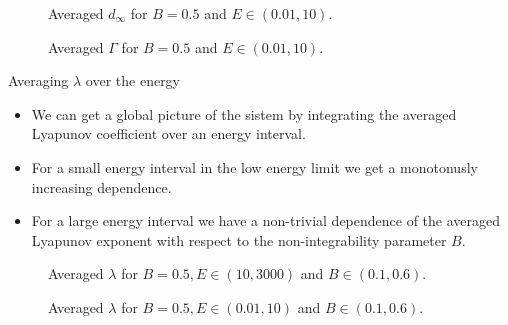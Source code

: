 \documentclass{beamer}
\begin{document}

\begin{frame}
	\begin{figure}
		
		\caption{Averaged \(d_\infty\) for \(B=0.5\) and \(E \in (0.01, 10)\).}
	\end{figure}
\end{frame}


\begin{frame}
	\begin{figure}
		
		\caption{Averaged \(\Gamma\) for \(B=0.5\) and \(E \in (0.01, 10)\).}
	\end{figure}
\end{frame}


\begin{frame}{Averaging \(\lambda\) over the energy}
	\begin{itemize}
		\item We can get a global picture of the sistem by integrating
		the averaged Lyapunov coefficient over an energy interval.
		\item For a small energy interval in the low energy limit we
		get a monotonusly increasing dependence.
		\item For a large energy interval we have a non-trivial
		dependence of the averaged Lyapunov exponent with respect
		to the non-integrability parameter $B$.
	\end{itemize}
\end{frame}


\begin{frame}
	\begin{figure}
		
		\caption{Averaged \(\lambda\) for \(B=0.5, E \in (10, 3000)\)
		and \(B \in (0.1, 0.6)\).}
	\end{figure}
\end{frame}


\begin{frame}
	\begin{figure}
		
		\caption{Averaged \(\lambda\) for \(B=0.5, E \in (0.01, 10)\)
		and \(B \in (0.1, 0.6)\).}
	\end{figure}
\end{frame}
\end{document}

